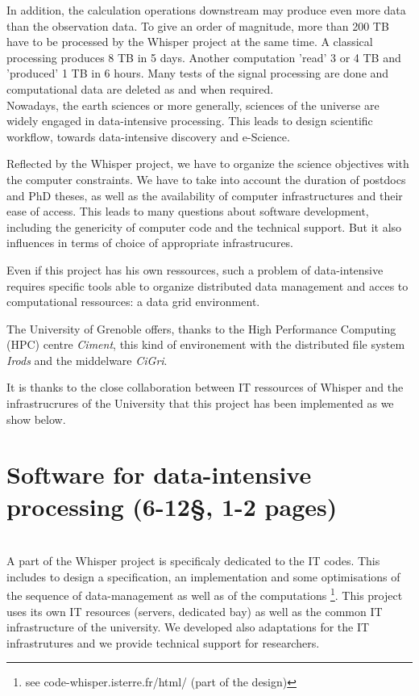 \documentclass[a4paper, 10pt]{article}
\begin{document}
\begin{multicols}{2}
In addition, the calculation operations downstream may produce even more data than the observation data.
To give an order of magnitude, more than 200 TB have to be processed by the Whisper project at the same time. 
A classical processing produces 8 TB in 5 days. Another computation 'read' 3 or 4 TB and 'produced' 1 TB in 6 hours.
Many tests of the signal processing are done and computational data are deleted as and when required.
\\


Nowadays, the earth sciences or more generally, sciences of the universe are widely engaged in
data-intensive processing. This leads to design scientific workflow, towards data-intensive discovery and e-Science.


Reflected by the Whisper project, we have to organize the science objectives with
the computer constraints. We have to take into account 
the duration of postdocs and PhD theses, as well as the availability of computer infrastructures and their ease of access. 
This leads to many questions about software development, including the genericity of computer code and 
the technical support. But it also influences in terms of choice of appropriate infrastrucures.

Even if this project has his own ressources, such a problem of data-intensive requires specific tools able to 
organize distributed data management and acces to computational ressources: a data grid environment.

The University of Grenoble offers, thanks to the High Performance Computing (HPC) centre \emph{Ciment}, this kind of environement with the distributed file system \emph{Irods}
and the middelware \emph{CiGri}.%


It is thanks to the close collaboration between IT ressources of Whisper and the infrastrucrures of the University
that this project has been implemented as we show below.


\newpage

\section{Software for data-intensive processing (6-12\S , 1-2 pages) } \label{Section_Software_for_data-intensive_processing}
~\\


A part of the Whisper project is specificaly dedicated to the IT codes. This includes to design a specification, an implementation and some optimisations of the sequence of data-management as well as of the computations \footnote{see code-whisper.isterre.fr/html/ (part of the design)}.
This project uses its own IT resources (servers, dedicated bay) as well as the common IT infrastructure of the university.
We developed also adaptations for the IT infrastrutures and we provide technical support for researchers.


\end{multicols}
\end{document}

